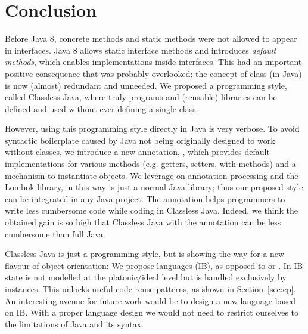 \section{Conclusion}\label{sec:conclusion}
Before Java 8, concrete methods and static methods were not allowed
to appear in interfaces.  Java 8 allows static interface methods and
introduces \emph{default methods}, which enables implementations
inside interfaces. This had an important positive consequence that
was probably overlooked: the concept of class
(in Java) is now (almost) redundant and unneeded.
We proposed a programming style, called Classless Java, where
truly \objectoriented programs and (reusable) libraries
can be defined and used without ever defining a single class.

However, using this programming style directly in Java is very verbose.
To avoid syntactic boilerplate
caused by Java not being originally designed to work without classes,
we introduce a new annotation, \mixin, which provides default implementations
for various methods (e.g. getters, setters, with-methods) and a
mechanism to instantiate objects.
We leverage on annotation processing and the Lombok library, in this way
\mixin is just a normal Java library; thus our proposed style can be integrated
in any Java project.
The \mixin annotation helps programmers
to write less cumbersome code while coding in Classless Java. Indeed,
we think the obtained gain is so high that Classless Java with the \mixin
annotation can be less cumbersome than full Java.

Classless Java is just a programming style, but is showing the way
for a new flavour of object orientation: We propose \interfacebased
\objectoriented languages (IB), as opposed to \classbased or
\prototypebased.  In IB state is not modelled at the platonic/ideal
level but is handled exclusively by instances.  This unlocks useful
code reuse patterns, as shown in Section~\ref{sec:ep}.
An interesting avenue for future work would be to design a new
language based on IB. With a proper language design we would not need
to restrict ourselves to the limitations of Java and its syntax.



